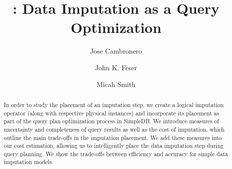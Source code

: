 \documentclass{article}
\title{\ProjectName{}: Data Imputation as a Query Optimization}
\author{
  Jose Cambronero \\
  \and
  John K. Feser
  \and
  Micah Smith}
\begin{document}
\maketitle

\begin{abstract}
In order to study the placement of an imputation step, we create a logical imputation operator (along with respective physical instances) and incorporate its placement as part of the query plan optimization process in SimpleDB.  We introduce measures of uncertainty and completeness of query results as well as the cost of imputation, which outline the main trade-offs in the imputation placement. We add these measures into our cost estimation, allowing us to intelligently place the data imputation step during query planning. We show the trade-offs between efficiency and accuracy for simple data imputation models. \end{abstract}








\printbibliography
\end{document}

